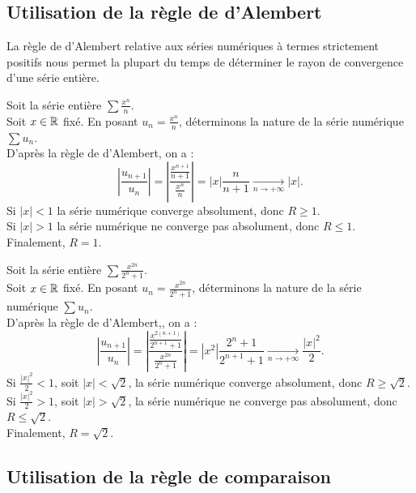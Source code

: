 \documentclass{book}
\begin{document}
\subsection{Utilisation de la règle de d'Alembert}
La règle de d'Alembert relative aux séries numériques à termes strictement positifs nous permet la plupart
du temps de déterminer le rayon de convergence d'une série entière. 
\begin{Exemple}
Soit la série entière $\sum \frac{x^n}{n}$.\\
Soit $x\in \mathbb{R}$ fixé. En posant $u_n=\frac{x^n}{n}$, déterminons la nature de la série numérique  $\sum u_n$.\\
D'après la règle de d'Alembert, on a :
$$ \left| \frac{u_{n+1}}{u_n} \right|=\left|  \frac{\frac{x^{n+1}}{n+1}}{\frac{x^n}{n} }  \right|= |x|\frac{n}{n+1}\xrightarrow[n\to +\infty]{} |x|.$$
Si $|x|<1$ la série numérique converge absolument, donc $R\geq 1$.\\
Si $|x|>1$ la série numérique ne converge pas absolument, donc $R\leq 1$.\\
Finalement, $R=1$.
\end{Exemple}

\begin{Exemple}
Soit la série entière $\sum \frac{x^{2n}}{2^n+1}$.\\
Soit $x\in \mathbb{R}$ fixé.  En posant $u_n=\frac{x^{2n}}{2^n+1}$, déterminons la nature de la série numérique  $\sum u_n$.\\
D'après la règle de d'Alembert,, on a :
$$ \left| \frac{u_{n+1}}{u_n} \right|=\left|  \frac{\frac{x^{2(n+1)}}{2 ^{n+1}+1}}{\frac{x^{2n}}{2^n+1}}  \right|= |x^2|\frac{2^n+1}{2 ^{n+1}+1}\xrightarrow[n\to +\infty]{} \frac{|x|^2}{2}.$$
Si $ \frac{|x|^2}{2}<1$, soit $|x|<\sqrt{2}$, la série numérique converge absolument, donc $R\geq \sqrt{2}$.\\
Si  $ \frac{|x|^2}{2}>1$, soit $|x|>\sqrt{2}$, la série numérique ne converge pas absolument, donc $R\leq \sqrt{2}$.\\
Finalement, $R=\sqrt{2}$.
\end{Exemple}

\subsection{Utilisation de la règle de comparaison}
\end{document}
